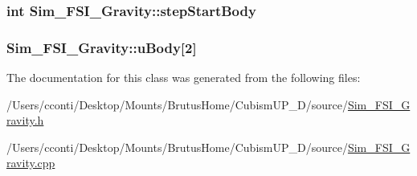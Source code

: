 \subsubsection[{step\+Start\+Body}]{\setlength{\rightskip}{0pt plus 5cm}int Sim\+\_\+\+F\+S\+I\+\_\+\+Gravity\+::step\+Start\+Body\hspace{0.3cm}{\ttfamily [protected]}}\label{class_sim___f_s_i___gravity_abeb07be239cdde2ac71a301ac867e8b3}
\hypertarget{class_sim___f_s_i___gravity_af025ee4e8818049798588010ed5ec20b}{}
\subsubsection[{u\+Body}]{ Sim\+\_\+\+F\+S\+I\+\_\+\+Gravity\+::u\+Body\mbox{[}2\mbox{]}\hspace{0.3cm}{\ttfamily [protected]}}\label{class_sim___f_s_i___gravity_af025ee4e8818049798588010ed5ec20b}


The documentation for this class was generated from the following files\+:\begin{DoxyCompactItemize}
\item 
/\+Users/cconti/\+Desktop/\+Mounts/\+Brutus\+Home/\+Cubism\+U\+P\+\_\+D/source/\hyperlink{_sim___f_s_i___gravity_8h}{Sim\+\_\+\+F\+S\+I\+\_\+\+Gravity.\+h}\item 
/\+Users/cconti/\+Desktop/\+Mounts/\+Brutus\+Home/\+Cubism\+U\+P\+\_\+D/source/\hyperlink{_sim___f_s_i___gravity_8cpp}{Sim\+\_\+\+F\+S\+I\+\_\+\+Gravity.\+cpp}\end{DoxyCompactItemize}
